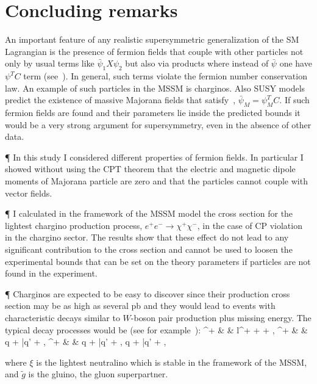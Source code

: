 \chapter{Concluding remarks}

An important feature of any realistic supersymmetric generalization of
the SM Lagrangian is the presence of fermion fields that couple with other 
particles not only by usual terms like $\bar\psi_1 X \psi_2$ 
but also via products where instead of $\bar\psi$ one have $\psi^T C$ 
term (see~). In general, such terms violate the fermion number 
conservation law. An example of such particles in the MSSM is charginos.
Also SUSY models predict the existence of massive Majorana 
fields that satisfy~, $\bar\psi_M = \psi_M^T C$.
If such fermion fields are found and their parameters lie inside 
the predicted bounds it would be a very strong argument 
for supersymmetry, even in the absence of other data.

\P
In this study I considered different properties of fermion fields.
In particular I showed without using the CPT theorem that the electric 
and magnetic dipole moments of Majorana particle are zero and 
that the particles
cannot couple with vector fields.

\P
I calculated in the framework of the MSSM model 
the cross section for the lightest chargino production process,
$e^+e^-\rightarrow \chi^+\chi^-$, in the case of CP violation
in the chargino sector. The results show that these effect do not 
lead to any significant contribution to the cross section  and cannot be 
used to loosen the experimental bounds that can be set on the theory
parameters if particles are not found in the experiment.


\P
Charginos are expected to be easy to discover since their 
production cross section may be as high as several pb 
and they would lead to events with
characteristic decays similar to $W$-boson pair production plus 
missing energy. The typical decay processes would be 
(see for example~\cite{CharginoSignatures}):
\bem
\chi^+ & \rightarrow & l^+ + \nu + \xi,
\nel
\chi^+ & \rightarrow & q + \bar{q}' + \xi,
\nel
\chi^+ & \rightarrow & q + \bar{q}' + , \quad 
{}\; \rightarrow\; q + \bar{q}' + \xi,
\ee

where $\xi$ is the lightest neutralino which is stable in the framework 
of the MSSM, and $\tilde{g}$ is the gluino, the gluon superpartner.


